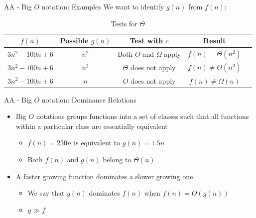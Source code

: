 \documentclass{beamer}
\begin{document}
\begin{frame}{AA - Big $O$ notation: Examples}
    We want to identify $g(n)$ from $f(n)$:
    \begin{table}[H]
        \centering
        \begin{tabular}{|c|c|c|c|c|}
            \hline
            $f(n)$ & Possible $g(n)$ & Test with $c$ & Result \\ \hline
            $3n^2-100n+6$ & $n^2$ & Both $O$ and $\Omega$ apply & $f(n) = \Theta(n^2)$ \\ \hline
            $3n^2-100n+6$ & $n^3$ & $\Theta$ does not apply & $f(n) \neq \Theta(n^3)$ \\ \hline
            $3n^2-100n+6$ & $n$ & $O$ does not apply & $f(n) \neq \Omega(n)$ \\ \hline
        \end{tabular}
        \caption{Tests for $\Theta$}
    \end{table}
\end{frame}

\begin{frame}{AA - Big $O$ notation: Dominance Relations}
    \begin{itemize}
        \item Big $O$ notations groups functions into a set of classes such that all functions within a particular class are essentially equivalent
            \begin{itemize}
                \item $f(n) = 230n$ is equivalent to $g(n) = 1.5n$
                \item Both $f(n)$ and $g(n)$ belong to $\Theta(n)$
            \end{itemize}
        \item A faster growing function dominates a slower growing one
            \begin{itemize}
                \item We say that $g(n)$ dominates $f(n)$ when $f(n) = O(g(n))$
                \item $g \gg f$
            \end{itemize}
    \end{itemize}
\end{frame}
\end{document}

